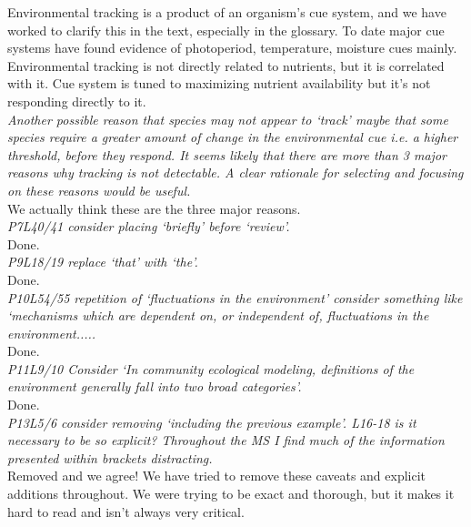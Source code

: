 \documentclass[11pt]{article}
\begin{document}
Environmental tracking is a product of an organism's cue system, and we have worked to clarify this in the text, especially in the glossary. To date major cue systems have found evidence of photoperiod, temperature, moisture cues mainly. Environmental tracking is not directly related to nutrients, but it is correlated with it. Cue system is tuned to maximizing nutrient availability but it’s not responding directly to it. \\

\emph{Another possible reason that species may not appear to `track' maybe that some species
require a greater amount of change in the environmental cue i.e. a higher threshold, before they respond. It seems likely that there are more than 3 major reasons why tracking is not detectable. A clear rationale for selecting and focusing on these reasons would be useful.}\\

We actually think these are the three major reasons.\\

\emph{P7L40/41 consider placing `briefly' before `review'.}\\

Done.\\

\emph{P9L18/19 replace `that' with `the'.}\\

Done.\\

\emph{P10L54/55 repetition of `fluctuations in the environment' consider something like `mechanisms
which are dependent on, or independent of, fluctuations in the environment.....}\\

Done.\\

\emph{P11L9/10 Consider `In community ecological modeling, definitions of the environment generally
fall into two broad categories'.}\\

Done.\\

\emph{P13L5/6 consider removing `including the previous example'. L16-18 is it necessary to be so
explicit? Throughout the MS I find much of the information presented within brackets
distracting. }\\

Removed and we agree! We have tried to remove these caveats and explicit additions throughout. We were trying to be exact and thorough, but it makes it hard to read and isn't always very critical.\\
\end{document}

